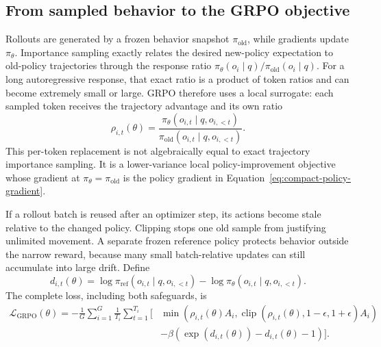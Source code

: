 \subsection{From sampled behavior to the GRPO objective}

Rollouts are generated by a frozen behavior snapshot $\pi_{\mathrm{old}}$, while gradients
update $\pi_\theta$. Importance sampling exactly relates the desired new-policy expectation
to old-policy trajectories through the response ratio
$\pi_\theta(o_i\mid q)/\pi_{\mathrm{old}}(o_i\mid q)$. For a long autoregressive response,
that exact ratio is a product of token ratios and can become extremely small or large.
GRPO therefore uses a local surrogate: each sampled token receives the trajectory
advantage and its own ratio
\begin{equation}
  \rho_{i,t}(\theta)
  =\frac{\pi_\theta(o_{i,t}\mid q,o_{i,<t})}
         {\pi_{\mathrm{old}}(o_{i,t}\mid q,o_{i,<t})}.
  \label{eq:compact-grpo-ratio}
\end{equation}
This per-token replacement is not algebraically equal to exact trajectory importance
sampling. It is a lower-variance local policy-improvement objective whose gradient at
$\pi_\theta=\pi_{\mathrm{old}}$ is the policy gradient in
Equation~\ref{eq:compact-policy-gradient}.

If a rollout batch is reused after an optimizer step, its actions become stale relative to
the changed policy. Clipping stops one old sample from justifying unlimited movement. A
separate frozen reference policy protects behavior outside the narrow reward, because many
small batch-relative updates can still accumulate into large drift. Define
\begin{equation}
  d_{i,t}(\theta)
  =\log\pi_{\mathrm{ref}}(o_{i,t}\mid q,o_{i,<t})
   -\log\pi_\theta(o_{i,t}\mid q,o_{i,<t}).
  \label{eq:compact-grpo-reference-log-ratio}
\end{equation}
The complete loss, including both safeguards, is
\begin{equation}
  \begin{aligned}
  \mathcal{L}_{\mathrm{GRPO}}(\theta)
  =-\frac{1}{G}\sum_{i=1}^{G}\frac{1}{T_i}\sum_{t=1}^{T_i}
  \Big[&\min\!\left(\rho_{i,t}(\theta)A_i,
      \operatorname{clip}(\rho_{i,t}(\theta),1-\epsilon,1+\epsilon)A_i\right) \\
    &-\beta\left(\exp(d_{i,t}(\theta))-d_{i,t}(\theta)-1\right)
  \Big].
  \end{aligned}
  \label{eq:compact-grpo-loss}
\end{equation}

